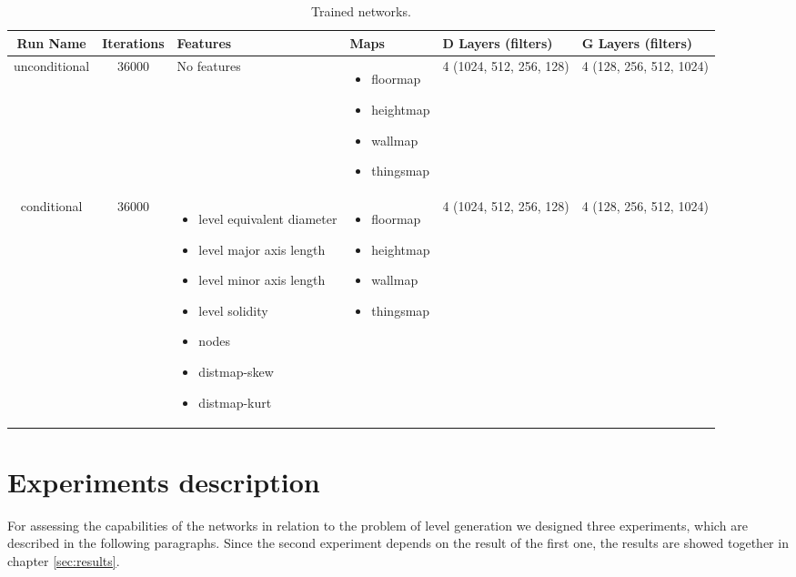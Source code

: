 \begin{table}[h!]
	\begin{tabularx}{\textwidth}{| c | c | X | X | X | X |}
		\hline
		\textbf{Run Name} & \textbf{Iterations} & \textbf{Features} & \textbf{Maps} & \textbf{D Layers (filters)} & \textbf{G Layers (filters)} \\
		\hline
		
		
		
		unconditional & 36000 & 
		No features
		& 
		\begin{itemize}
			\raggedright
			\small
			\item[] floormap
			\item[] heightmap
			\item[] wallmap
			\item[] thingsmap
		\end{itemize}
		& 4 (1024, 512, 256, 128) & 4 (128, 256, 512, 1024)\\
		
		\hline
	
		conditional & 36000 & 
		\begin{itemize}
			\raggedright
			\small
			\item[] level equivalent diameter
			\item[] level major axis length
			\item[] level minor axis length
			\item[] level solidity
			\item[] nodes
			\item[] distmap-skew
			\item[] distmap-kurt
		\end{itemize}
		& 
		\begin{itemize}
			\raggedright
			\small
			\item[] floormap
			\item[] heightmap
			\item[] wallmap
			\item[] thingsmap
		\end{itemize}
		& 4 (1024, 512, 256, 128) & 4 (128, 256, 512, 1024)\\
		
		\hline
		
	\end{tabularx}
	\caption[ Trained Models ]{ Trained networks. }
	\label{tab:trained_models}
\end{table}	

\newpage
\section{Experiments description}
\label{sec:experiments}
For assessing the capabilities of the networks in relation to the problem of level generation we designed three experiments, which are described in the following paragraphs. Since the second experiment depends on the result of the first one, the results are showed together in chapter \ref{sec:results}.

